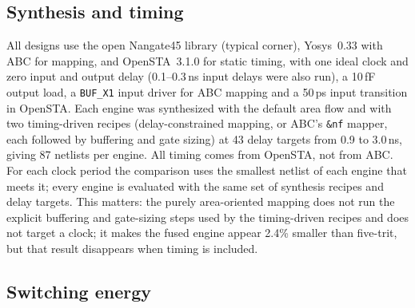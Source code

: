 \documentclass[11pt]{article}
\begin{document}
\subsection{Synthesis and timing}

All designs use the open Nangate45 library (typical corner), Yosys~0.33 with ABC for mapping, and OpenSTA~3.1.0 for static timing, with one ideal clock and zero input and output delay (0.1--0.3\,ns input delays were also run), a 10\,fF output load, a \texttt{BUF\_X1} input driver for ABC mapping and a 50\,ps input transition in OpenSTA. Each engine was synthesized with the default area flow and with two timing-driven recipes (delay-constrained mapping, or ABC's \texttt{\&nf} mapper, each followed by buffering and gate sizing) at 43 delay targets from 0.9 to 3.0\,ns, giving 87 netlists per engine. All timing comes from OpenSTA, not from ABC. For each clock period the comparison uses the smallest netlist of each engine that meets it; every engine is evaluated with the same set of synthesis recipes and delay targets. This matters: the purely area-oriented mapping does not run the explicit buffering and gate-sizing steps used by the timing-driven recipes and does not target a clock; it makes the fused engine appear 2.4\% smaller than five-trit, but that result disappears when timing is included.

\subsection{Switching energy}
\end{document}
